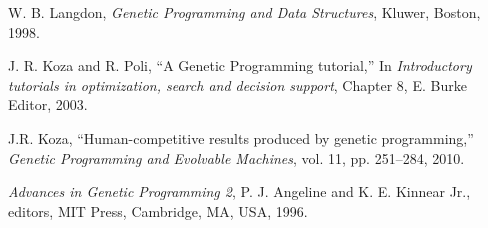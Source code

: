 \begin{thebibliography}{1}
W. B. Langdon, {\em Genetic Programming and Data Structures}, Kluwer, Boston, 1998.

J. R. Koza and R. Poli, ``A Genetic Programming tutorial,'' In {\em Introductory tutorials in optimization, search and
decision support}, Chapter 8, E. Burke Editor, 2003.

J.R. Koza, ``Human-competitive results produced by genetic programming,'' \emph{Genetic Programming and Evolvable Machines}, vol. 11, pp. 251--284, 2010.

 {\em Advances in Genetic Programming 2}, P. J. Angeline and K. E. Kinnear Jr., editors, MIT Press, Cambridge, MA, USA, 1996.




\end{thebibliography}






